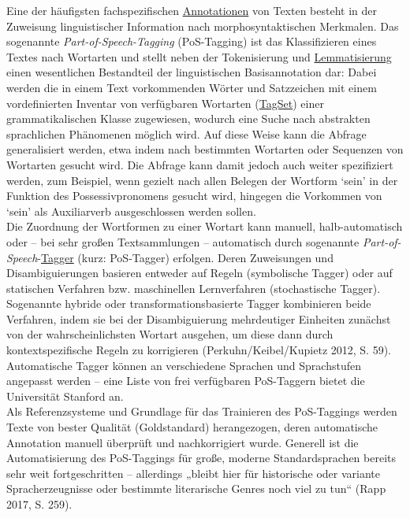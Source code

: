 \documentclass{article}
\begin{document}
    Eine der häufigsten fachspezifischen \href{http://gams.uni-graz.at/o:konde.17}{Annotationen} von Texten besteht in der Zuweisung linguistischer Information nach morphosyntaktischen Merkmalen. Das sogenannte \emph{Part-of-Speech-Tagging} (PoS-Tagging) ist das Klassifizieren eines Textes nach Wortarten und stellt neben der Tokenisierung und \href{http://gams.uni-graz.at/o:konde.115}{Lemmatisierung} einen wesentlichen Bestandteil der linguistischen Basisannotation dar: Dabei werden die in einem Text vorkommenden Wörter und Satzzeichen mit einem vordefinierten Inventar von verfügbaren Wortarten (\href{http://gams.uni-graz.at/o:konde.177}{TagSet}) einer grammatikalischen Klasse zugewiesen, wodurch eine Suche nach abstrakten sprachlichen Phänomenen möglich wird. Auf diese Weise kann die Abfrage generalisiert werden, etwa indem nach bestimmten Wortarten oder Sequenzen von Wortarten gesucht wird. Die Abfrage kann damit jedoch auch weiter spezifiziert werden, zum Beispiel, wenn gezielt nach allen Belegen der Wortform ‘sein’ in der Funktion des Possessivpronomens gesucht wird, hingegen die Vorkommen von ‘sein’ als Auxiliarverb ausgeschlossen werden sollen.\\
            
        Die Zuordnung der Wortformen zu einer Wortart kann manuell, halb-automatisch oder – bei sehr großen Textsammlungen – automatisch durch sogenannte \emph{Part-of-Speech}-\href{http://gams.uni-graz.at/o:konde.176}{Tagger} (kurz: PoS-Tagger) erfolgen. Deren Zuweisungen und Disambiguierungen basieren entweder auf Regeln (symbolische Tagger) oder auf statischen Verfahren bzw. maschinellen Lernverfahren (stochastische Tagger). Sogenannte hybride oder transformationsbasierte Tagger kombinieren beide Verfahren, indem sie bei der Disambiguierung mehrdeutiger Einheiten zunächst von der wahrscheinlichsten Wortart ausgehen, um diese dann durch kontextspezifische Regeln zu korrigieren (Perkuhn/Keibel/Kupietz 2012, S. 59). Automatische Tagger können an verschiedene Sprachen und Sprachstufen angepasst werden – eine Liste von frei verfügbaren PoS-Taggern bietet die Universität Stanford an.
               \\
            
        Als Referenzsysteme und Grundlage für das Trainieren des PoS-Taggings werden Texte von bester Qualität (Goldstandard) herangezogen, deren automatische Annotation manuell überprüft und nachkorrigiert wurde. Generell ist die Automatisierung des PoS-Taggings für große, moderne Standardsprachen bereits sehr weit fortgeschritten – allerdings „bleibt hier für historische oder variante Spracherzeugnisse oder bestimmte literarische Genres noch viel zu tun“  (Rapp 2017, S. 259).
               \\
            
\end{document}
